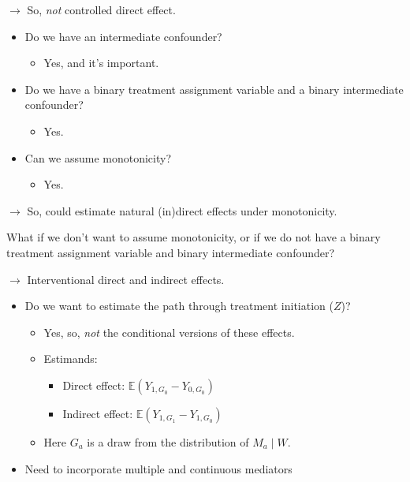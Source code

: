\documentclass[
  12pt,
]{book}
\providecommand{\tightlist}{%
  \setlength{\itemsep}{0pt}\setlength{\parskip}{0pt}}
\theoremstyle{definition}
\theoremstyle{definition}
\theoremstyle{definition}
\newcommand{\E}{\mathbb{E}}
\newcommand{\1}{\mathbbm{1}}
\begin{document}
\(\rightarrow\) So, \emph{not} controlled direct effect.

\begin{itemize}
\tightlist
\item
  Do we have an intermediate confounder?

  \begin{itemize}
  \tightlist
  \item
    Yes, and it's important.
  \end{itemize}
\item
  Do we have a binary treatment assignment variable and a binary intermediate
  confounder?

  \begin{itemize}
  \tightlist
  \item
    Yes.
  \end{itemize}
\item
  Can we assume monotonicity?

  \begin{itemize}
  \tightlist
  \item
    Yes.
  \end{itemize}
\end{itemize}

\(\rightarrow\) So, could estimate natural (in)direct effects under monotonicity.

What if we don't want to assume monotonicity, or if we do not have a binary
treatment assignment variable and binary intermediate confounder?

\(\rightarrow\) Interventional direct and indirect effects.

\begin{itemize}
\tightlist
\item
  Do we want to estimate the path through treatment initiation (\(Z\))?

  \begin{itemize}
  \tightlist
  \item
    Yes, so, \emph{not} the conditional versions of these effects.
  \item
    Estimands:

    \begin{itemize}
    \tightlist
    \item
      Direct effect: \(\E(Y_{1,G_0} - Y_{0,G_0})\)
    \item
      Indirect effect: \(\E(Y_{1,G_1} - Y_{1,G_0})\)
    \end{itemize}
  \item
    Here \(G_a\) is a draw from the distribution of \(M_a\mid W\).
  \end{itemize}
\item
  Need to incorporate multiple and continuous mediators
\end{itemize}
\end{document}
